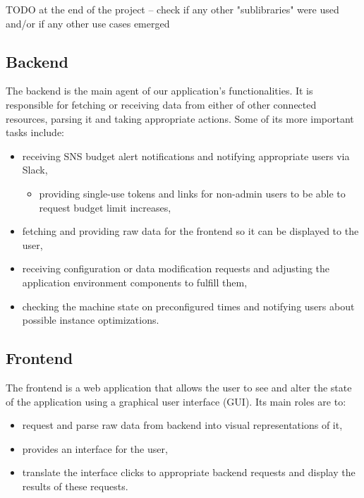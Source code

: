 \documentclass[licencjacka,en]{thesisclass}
\begin{document}
    TODO at the end of the project -- check if any other
    "sublibraries" were used and/or if any other use cases emerged

    \subsection{Backend}

    The backend is the main agent of our application's functionalities.
    It is responsible for fetching or receiving data from either
    of other connected resources, parsing it and taking appropriate actions.
    Some of its more important tasks include:
    \begin{itemize}
        \item receiving SNS budget alert notifications
          and notifying appropriate users via Slack,
        \begin{itemize}
            \item providing single-use tokens and links
              for non-admin users to be able to request budget limit increases,
        \end{itemize}
        \item fetching and providing raw data for the frontend
          so it can be displayed to the user,
        \item receiving configuration or data modification requests
          and adjusting the application environment components to fulfill them,
        \item checking the machine state on preconfigured times
          and notifying users about possible instance optimizations.
    \end{itemize}

    \subsection{Frontend}
    The frontend is a web application that allows the user to see
    and alter the state of the application using a graphical user interface (GUI).
    Its main roles are to:
    \begin{itemize}
        \item request and parse raw data from backend into visual representations of it,
        \item provides an interface for the user,
        \item translate the interface clicks to appropriate backend requests
          and display the results of these requests.
    \end{itemize}
\end{document}
